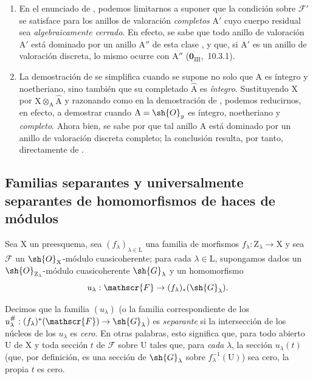 \begin{remarks}[11.8.2]
\label{IV.11.8.2}
\medskip\noindent
\begin{enumerate}[label=(\roman*)]
  \item En el enunciado de , podemos limitarnos a suponer que la condición sobre $\mathscr{F}'$ se satisface para los anillos de valoración \emph{completos} $\mathrm{A}'$ cuyo cuerpo residual sea \emph{algebraicamente cerrado}.
  En efecto, se sabe que todo anillo de valoración $\mathrm{A}'$ está dominado por un anillo $\mathrm{A}''$ de esta clase , y que, si $\mathrm{A}'$ es un anillo de valoración discreta, lo mismo ocurre con $\mathrm{A}''$ ($\mathbf{0}_{\mathrm{III}}$,~10.3.1).
  \item La demostración de  se simplifica cuando se supone no solo que $\mathrm{A}$ es íntegro y noetheriano, sino también que su completado $\hat{\mathrm{A}}$ es \emph{íntegro}.
  Sustituyendo $\mathrm{X}$ por $\mathrm{X}\otimes_\mathrm{A}\hat{\mathrm{A}}$ y razonando como en la demostración de , podemos reducirnos, en efecto, a demostrar  cuando $\mathrm{A}=\sh{O}_y$ es íntegro, noetheriano y \emph{completo}.
  Ahora bien, se sabe por  que tal anillo $\mathrm{A}$ está dominado por un anillo de valoración discreta completo; la conclusión resulta, por tanto, directamente de .
\end{enumerate}
\end{remarks}

\subsection{Familias separantes y universalmente separantes de homomorfismos de haces de módulos}
\label{subsection:IV.11.9}

\begin{env}[11.9.1]
\label{IV.11.9.1}
Sea $\mathrm{X}$ un preesquema, sea $(f_\lambda)_{\lambda\in\mathrm{L}}$ una familia de morfismos $f_\lambda:\mathrm{Z}_\lambda\to\mathrm{X}$ y sea $\mathscr{F}$ un $\sh{O}_\mathrm{X}$-módulo cuasicoherente; para cada $\lambda\in\mathrm{L}$, supongamos dados un $\sh{O}_{\mathrm{Z}_\lambda}$-módulo cuasicoherente $\sh{G}_\lambda$ y un homomorfismo
\[
  u_\lambda:\mathscr{F}\to(f_\lambda)_*(\sh{G}_\lambda).
\label{IV.11.9.1.1}
\]
\end{env}

Decimos que la familia $(u_\lambda)$ (o la familia correspondiente de los $u_\lambda^{\#}:(f_\lambda)^*(\mathscr{F})\to\sh{G}_\lambda$) es \emph{separante} si la intersección de los núcleos de los $u_\lambda$ es \emph{cero}.
En otras palabras, esto significa que, para todo abierto $\mathrm{U}$ de $\mathrm{X}$ y toda sección $t$ de $\mathscr{F}$ sobre $\mathrm{U}$ tales que, para \emph{cada} $\lambda$, la sección $u_\lambda(t)$ (que, por definición, es una sección de $\sh{G}_\lambda$ sobre $f_\lambda^{-1}(\mathrm{U})$) sea cero, la propia $t$ es cero.


